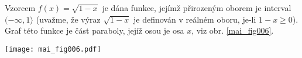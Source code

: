 \wikitextrule
\begin{example}\label{MAI:exam018} 
  Vzorcem $f(x)=\sqrt{1-x}$ je dána funkce, jejímž přirozeným oborem je interval 
  $(-\infty,1\rangle$ (uvažme, že výraz $\sqrt{1-x}$ je definován v reálném oboru, je-li 
  $1-x\geq0$). Graf této funkce je část paraboly, jejíž osou je osa $x$, viz obr. 
  \ref{mai_fig006}.
  
  {\centering
   \captionsetup{type=figure}
%  
   \texttt{[image: mai\_fig006.pdf]}
   \label{mai_fig006}
   \par}

\end{example}
